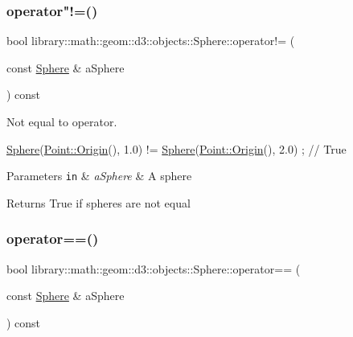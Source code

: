 \subsubsection{\texorpdfstring{operator"!=()}{operator!=()}}
{\footnotesize\ttfamily bool library\+::math\+::geom\+::d3\+::objects\+::\+Sphere\+::operator!= (\begin{DoxyParamCaption}\item[{const \hyperlink{classlibrary_1_1math_1_1geom_1_1d3_1_1objects_1_1_sphere}{Sphere} \&}]{a\+Sphere }\end{DoxyParamCaption}) const}



Not equal to operator. 


\begin{DoxyCode}
\hyperlink{classlibrary_1_1math_1_1geom_1_1d3_1_1objects_1_1_sphere_a55dccc8ea16ee55cd7694c26afa8ea39}{Sphere}(\hyperlink{classlibrary_1_1math_1_1geom_1_1d3_1_1objects_1_1_point_ab2a38e285c562e50bf350272c083986f}{Point::Origin}(), 1.0) != \hyperlink{classlibrary_1_1math_1_1geom_1_1d3_1_1objects_1_1_sphere_a55dccc8ea16ee55cd7694c26afa8ea39}{Sphere}(\hyperlink{classlibrary_1_1math_1_1geom_1_1d3_1_1objects_1_1_point_ab2a38e285c562e50bf350272c083986f}{Point::Origin}(), 2.0) ; \textcolor{comment}{//
       True}
\end{DoxyCode}



\begin{DoxyParams}[1]{Parameters}
\mbox{\tt in}  & {\em a\+Sphere} & A sphere \\
\hline
\end{DoxyParams}
\begin{DoxyReturn}{Returns}
True if spheres are not equal 
\end{DoxyReturn}
\mbox{\label{classlibrary_1_1math_1_1geom_1_1d3_1_1objects_1_1_sphere_ace12dcb88802f002f5797077130c4b98}} 
\subsubsection{\texorpdfstring{operator==()}{operator==()}}
{\footnotesize\ttfamily bool library\+::math\+::geom\+::d3\+::objects\+::\+Sphere\+::operator== (\begin{DoxyParamCaption}\item[{const \hyperlink{classlibrary_1_1math_1_1geom_1_1d3_1_1objects_1_1_sphere}{Sphere} \&}]{a\+Sphere }\end{DoxyParamCaption}) const}



